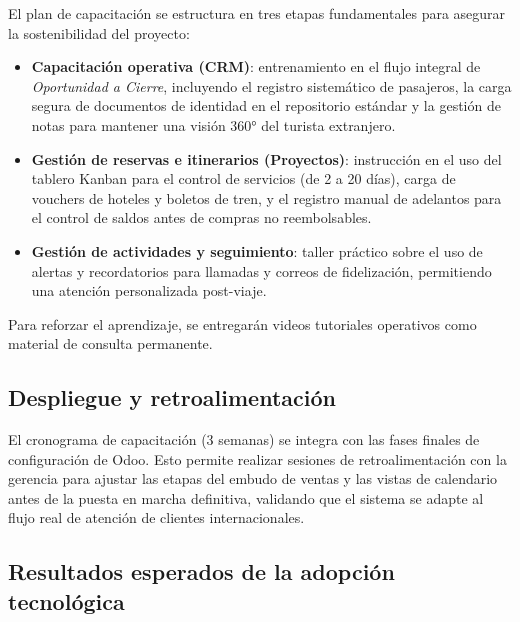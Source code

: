 \begin{indentedsubsection}
El plan de capacitación se estructura en tres etapas fundamentales para asegurar la sostenibilidad del proyecto:

\begin{itemize}
    \item[a.] \textbf{Capacitación operativa (CRM)}: entrenamiento en el flujo integral de \emph{Oportunidad a Cierre}, incluyendo el registro sistemático de pasajeros, la carga segura de documentos de identidad en el repositorio estándar y la gestión de notas para mantener una visión 360° del turista extranjero.
    \item[b.] \textbf{Gestión de reservas e itinerarios (Proyectos)}: instrucción en el uso del tablero Kanban para el control de servicios (de 2 a 20 días), carga de vouchers de hoteles y boletos de tren, y el registro manual de adelantos para el control de saldos antes de compras no reembolsables.
    \item[c.] \textbf{Gestión de actividades y seguimiento}: taller práctico sobre el uso de alertas y recordatorios para llamadas y correos de fidelización, permitiendo una atención personalizada post-viaje.
\end{itemize}

Para reforzar el aprendizaje, se entregarán videos tutoriales operativos como material de consulta permanente.

\end{indentedsubsection}

\subsection{Despliegue y retroalimentación}

\begin{indentedsubsection}
El cronograma de capacitación (3 semanas) se integra con las fases finales de configuración de Odoo. Esto permite realizar sesiones de retroalimentación con la gerencia para ajustar las etapas del embudo de ventas y las vistas de calendario antes de la puesta en marcha definitiva, validando que el sistema se adapte al flujo real de atención de clientes internacionales.

\end{indentedsubsection}

\subsection{Resultados esperados de la adopción tecnológica}

